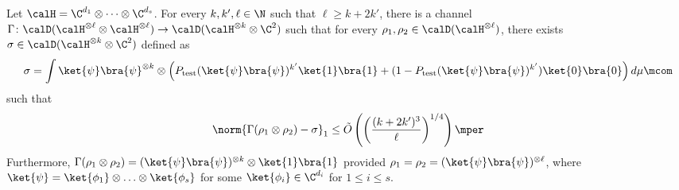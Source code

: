 \begin{corollary} \label{cor:separable-states}
  Let $\calH = \C^{d_1} \otimes \cdots \otimes \C^{d_s}$. For every $k,k',\ell \in \N$ such that $\ell\ge k+2k'$, there is a channel $\Gamma \colon \calD( \calH^{\otimes \ell} \otimes \calH^{\otimes \ell}) \to
  \calD(\calH^{\otimes k} \otimes \C^2)$ such that for every $\rho_1,\rho_2 \in \calD( \calH^{\otimes \ell})$, there exists $\sigma \in \calD(\calH^{\otimes k} \otimes \C^2)$
  defined as
  \begin{align*}
    \sigma = \int \ket{\psi}\bra{\psi}^{\otimes k} \otimes \left( P_{\text{test}}(\ket{\psi}\bra{\psi})^{k'}  \ket{1}\bra{1} +  (1-P_{\text{test}}(\ket{\psi}\bra{\psi})^{k'}) \ket{0}\bra{0} \right) d\mu\mcom
  \end{align*}
  such that
  \begin{align*}
    \norm{\Gamma(\rho_1 \otimes \rho_2) -  \sigma}_1 \le \tilde O\left(\left(\frac{(k+2k')^3}{\ell}\right)^{1/4}\right)\mper
  \end{align*}
  Furthermore, $\Gamma(\rho_1 \otimes \rho_2) = (\ket{\psi}\bra{\psi})^{\otimes k} \otimes \ket{1}\bra{1}$ provided
  $\rho_1 = \rho_2 = (\ket{\psi}\bra{\psi})^{\otimes \ell}$, where
  $\ket{\psi} = \ket{\phi_1}\otimes \ldots \otimes \ket{\phi_s}$ for some $\ket{\phi_i} \in \C^{d_i}$ for $1 \le i \le s$.
\end{corollary}  


